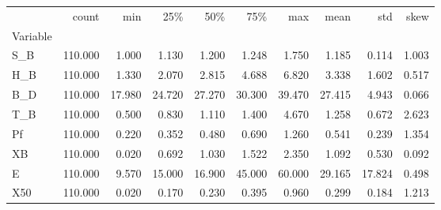 \begin{tabular}{lrrrrrrrrr}
\toprule
 & count & min & 25\% & 50\% & 75\% & max & mean & std & skew \\
Variable &  &  &  &  &  &  &  &  &  \\
\midrule
S\_B & 110.000 & 1.000 & 1.130 & 1.200 & 1.248 & 1.750 & 1.185 & 0.114 & 1.003 \\
H\_B & 110.000 & 1.330 & 2.070 & 2.815 & 4.688 & 6.820 & 3.338 & 1.602 & 0.517 \\
B\_D & 110.000 & 17.980 & 24.720 & 27.270 & 30.300 & 39.470 & 27.415 & 4.943 & 0.066 \\
T\_B & 110.000 & 0.500 & 0.830 & 1.110 & 1.400 & 4.670 & 1.258 & 0.672 & 2.623 \\
Pf & 110.000 & 0.220 & 0.352 & 0.480 & 0.690 & 1.260 & 0.541 & 0.239 & 1.354 \\
XB & 110.000 & 0.020 & 0.692 & 1.030 & 1.522 & 2.350 & 1.092 & 0.530 & 0.092 \\
E & 110.000 & 9.570 & 15.000 & 16.900 & 45.000 & 60.000 & 29.165 & 17.824 & 0.498 \\
X50 & 110.000 & 0.020 & 0.170 & 0.230 & 0.395 & 0.960 & 0.299 & 0.184 & 1.213 \\
\bottomrule
\end{tabular}
